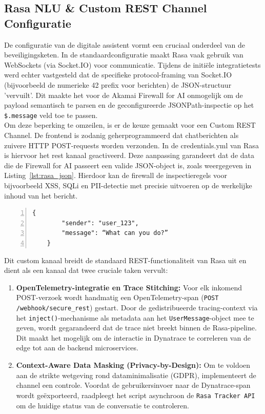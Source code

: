 \subsection{Rasa NLU \& Custom REST Channel Configuratie}
\label{sec:rasa_nlu_configuratie}

De configuratie van de digitale assistent vormt een cruciaal onderdeel van de beveiligingsketen. In de standaardconfiguratie maakt Rasa vaak gebruik van WebSockets (via Socket.IO) voor communicatie. Tijdens de initiële integratietests werd echter vastgesteld dat de specifieke protocol-framing van Socket.IO (bijvoorbeeld de numerieke 42 prefix voor berichten) de JSON-structuur 'vervuilt'. Dit maakte het voor de Akamai Firewall for AI onmogelijk om de payload semantisch te parsen en de geconfigureerde JSONPath-inspectie op het \texttt{\$.message} veld toe te passen.\\

Om deze beperking te omzeilen, is er de keuze gemaakt voor een Custom REST Channel. De frontend is zodanig geherprogrammeerd dat chatberichten als zuivere HTTP POST-requests worden verzonden. In de credentials.yml van Rasa is hiervoor het rest kanaal geactiveerd. Deze aanpassing garandeert dat de data die de Firewall for AI passeert een valide JSON-object is, zoals weergegeven in Listing~\ref{lst:rasa_json}. Hierdoor kan de firewall de inspectieregels voor bijvoorbeeld XSS, SQLi en PII-detectie met precisie uitvoeren op de werkelijke inhoud van het bericht.

\begin{lstlisting}[language={}, caption={Structuur van de REST-payload voor optimale WAF-inspectie}, label={lst:rasa_json}, breaklines=true, numbers=left,frame=single]
    {        
        "sender": "user_123", 
        "message": “What can you do?” 
    }
\end{lstlisting}

Dit custom kanaal breidt de standaard REST-functionaliteit van Rasa uit en dient als een kanaal dat twee cruciale taken vervult:

\begin{enumerate}
    \item \textbf{OpenTelemetry-integratie en Trace Stitching:} Voor elk inkomend POST-verzoek wordt handmatig een OpenTelemetry-span (\texttt{POST /webhook/secure\_rest}) gestart. Door de gedistribueerde tracing-context via het \texttt{inject()}-mechanisme als metadata aan het \texttt{UserMessage}-object mee te geven, wordt gegarandeerd dat de trace niet breekt binnen de Rasa-pipeline. Dit maakt het mogelijk om de interactie in Dynatrace te correleren van de edge tot aan de backend microservices.
    \item \textbf{Context-Aware Data Masking (Privacy-by-Design):} Om te voldoen aan de strikte wetgeving rond dataminimalisatie (GDPR), implementeert de channel een controle. Voordat de gebruikersinvoer naar de Dynatrace-span wordt geëxporteerd, raadpleegt het script asynchroon de \texttt{Rasa Tracker API} om de huidige status van de conversatie te controleren. 
\end{enumerate}

